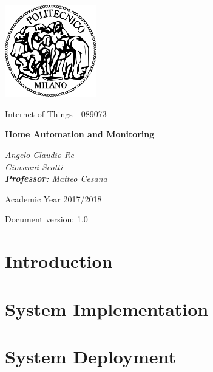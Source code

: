 \documentclass[a4paper,12pt]{report}
\begin{document}
\begin{titlepage}
\centering
\includegraphics[width=0.30\textwidth]{./pictures/logo_poli}\par
	\vspace{1.8cm}
	{\Large {Internet of Things - 089073} \par}
	\vspace{1.2cm}
	{\LARGE \textbf{Home Automation and Monitoring} \par}
	\vspace{2.5cm}
	\begin{flushright}
		{\Large\itshape{Angelo Claudio Re \\ Giovanni Scotti \\}
		\vspace{0.5cm} 
		\Large{\textbf{Professor:} Matteo Cesana}
	    \par}
	\end{flushright}
	\vspace{2cm}
	\vfill
	{\large Academic Year 2017/2018 \par}
	\vspace{0.3cm}
	{\large Document version: 1.0\par}
\end{titlepage}

\tableofcontents

\newpage
{}

\chapter{Introduction}
\label{ch:Introduction}


\chapter{System Implementation}
\label{ch:System Implementation}


\chapter{System Deployment}
\label{ch:System Deployment}

\end{document}

